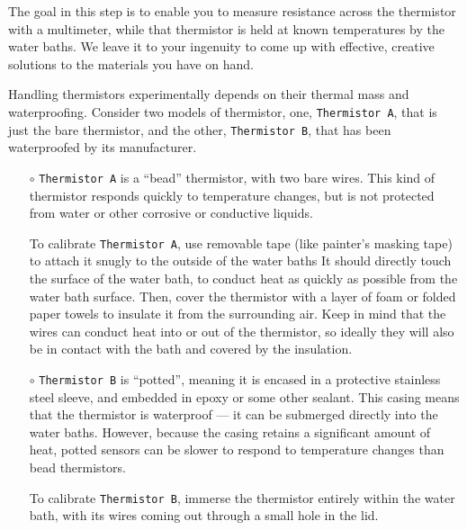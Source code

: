 \begin{enumerate}
	The goal in this step is to enable you to measure resistance across the thermistor with a multimeter, while that thermistor is held at known temperatures by the water baths.
	We leave it to your ingenuity to come up with effective, creative solutions to the materials you have on hand.

	\smallskip
	Handling thermistors experimentally depends on their thermal mass and waterproofing.  Consider two models of thermistor, one, \texttt{Thermistor A}, that is just the bare thermistor, and the other, \texttt{Thermistor B}, that has been waterproofed by its manufacturer.
	\begin{itemize}
		\item[$\circ$] \texttt{Thermistor A} is a ``bead'' thermistor, with two bare wires.
		This kind of thermistor responds quickly to temperature changes, but is not protected from water or other corrosive or conductive liquids.

		\smallskip
		To calibrate \texttt{Thermistor A}, use removable tape (like painter's masking tape) to attach it snugly to the outside of the water baths
		It should directly touch the surface of the water bath, to conduct heat as quickly as possible from the water bath surface.
		Then, cover the thermistor with a layer of foam or folded paper towels to insulate it from the surrounding air.
		Keep in mind that the wires can conduct heat into or out of the thermistor, so ideally they will also be in contact with the bath and covered by the insulation.

		\item[$\circ$] \texttt{Thermistor B} is ``potted'', meaning it is encased in a protective stainless steel sleeve, and embedded in epoxy or some other sealant.
		This casing means that the thermistor is waterproof --- it can be submerged directly into the water baths.
		However, because the casing retains a significant amount of heat, potted sensors can be slower to respond to temperature changes than bead thermistors.

		\smallskip
		To calibrate \texttt{Thermistor B}, immerse the thermistor entirely within the water bath, with its wires coming out through a small hole in the lid.


\end{itemize}
\end{enumerate}
